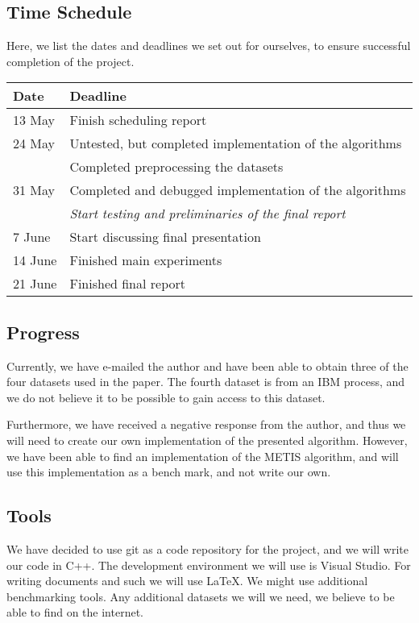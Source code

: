 \documentclass[a4paper,11pt]{article}
\begin{document}
\subsection{Time Schedule}
Here, we list the dates and deadlines we set out for ourselves, to ensure successful completion of the project.

\begin{tabular}{|l|l|}
\hline
\textbf{Date}	&	\textbf{Deadline}\\
\hline
13 May	&	Finish scheduling report\\
\hline
24 May	&	Untested, but completed implementation of the algorithms\\
		&	Completed preprocessing the datasets\\
\hline
31 May	&	Completed and debugged implementation of the algorithms\\
		& 	\textit{Start testing and preliminaries of the final report}\\
\hline
7 June	&	Start discussing final presentation\\
\hline
14 June	&	Finished main experiments\\
\hline
21 June	&	Finished final report\\
\hline
\end{tabular}

\subsection{Progress}
Currently, we have e-mailed the author and have been able to obtain three of the four datasets used in the paper. The fourth dataset is from an IBM process, and we do not believe it to be possible to gain access to this dataset. 

Furthermore, we have received a negative response from the author, and thus we will need to create our own implementation of the presented algorithm. However, we have been able to find an implementation of the METIS algorithm, and will use this implementation as a bench mark, and not write our own. 



\subsection{Tools} 
We have decided to use git as a code repository for the project, and we will write our code in C++. The development environment we will use is Visual Studio. For writing documents and such we will use \LaTeX. We might use additional benchmarking tools. Any additional datasets we will we need, we believe to be able to find on the internet. 
\end{document}
